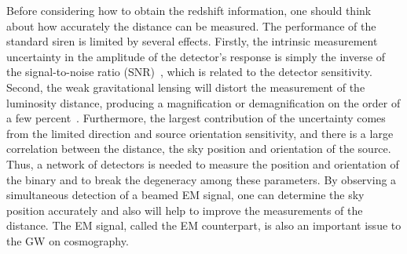 \documentclass[a4paper,11pt]{article}
\begin{document}
Before considering how to obtain the redshift information, one should think about how accurately the distance can be measured. The performance of the standard siren is limited by several effects. Firstly, the intrinsic measurement uncertainty in the amplitude of the detector's response is simply the inverse of the signal-to-noise ratio (SNR)~\cite{Sathyaprakash:2009xt,Cai:2016sby}, which is related to the detector sensitivity. Second, the weak gravitational lensing will distort the measurement of the luminosity distance, producing a magnification or demagnification on the order of a few percent~\cite{Bartelmann:1999yn,Holz:2005df,Dalal:2006qt,Jonsson:2006vc}. Furthermore, the largest contribution of the uncertainty comes from the limited direction and source orientation sensitivity, and there is a large correlation between the distance, the sky position and orientation of the source. Thus, a network of detectors is needed to measure the position and orientation of the binary and to break the degeneracy among  these parameters. By observing a simultaneous detection of a beamed EM signal, one can determine the sky position accurately and also will help to improve the measurements of the distance. The EM signal, called the EM counterpart, is also an important issue to the GW on cosmography.
\end{document}
